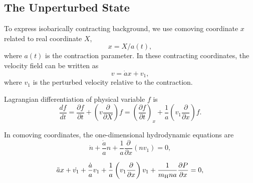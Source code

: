 \subsection{The Unperturbed State}

To express isobarically contracting background,
we use comoving coordinate $x$ related to real coordinate $X$,
\begin{equation}
x=X/a(t),
\end{equation}
where $a(t)$ is the contraction parameter.
In these contracting coordinates, the velocity field can be written as
\begin{equation}
v=\dot{a}x+v_1,
\end{equation}
where $v_1$ is the perturbed velocity relative to the contraction.

Lagrangian differentiation of physical variable $f$ is 
\begin{equation}
\frac{df}{dt}
=\frac{\partial f}{\partial t}+\left(v\frac{\partial}{\partial X}\right)f
=\left(\frac{\partial f}{\partial t}\right)_x
+\frac{1}{a}\left(v_1\frac{\partial}{\partial x}\right)f.
\end{equation}

In comoving coordinates, the one-dimensional hydrodynamic equations are
\begin{equation}
\dot{n}+\frac{\dot{a}}{a}n+\frac{1}{a}\frac{\partial}{\partial x}(nv_1)=0,
\end{equation}

\begin{equation}
\ddot{a}x+\dot{v_1}+\frac{\dot{a}}{a}v_1
+\frac{1}{a}\left(v_1\frac{\partial}{\partial x}\right)v_1
+\frac{1}{m_{\rm H}na}\frac{\partial P}{\partial x}=0,
\end{equation}

